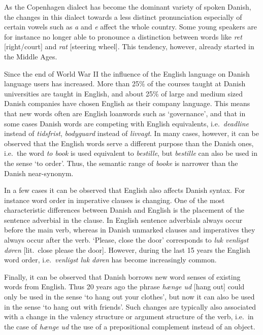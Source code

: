 \documentclass[]{../../metanetpaper}
\begin{document}
\begin{multicols}{2}
As the Copenhagen dialect has become the dominant variety of spoken Danish, the changes in this dialect towards a less distinct pronunciation especially of certain vowels such as {\it a} and {\it e} affect the whole country. Some young speakers are for instance no longer able to pronounce a distinction between words like {\it ret} [right/court]  and {\it rat} [steering wheel]. This tendency, however, already started in the Middle Ages. 

Since the end of World War II the influence of the English language on Danish language users has increased. More than 25\% of the courses taught at Danish universities are taught in English, and about 25\% of large and medium sized Danish companies have chosen English as their company language.   This means that new words often are English loanwords such as `governance', and that in some cases Danish words are competing with English equivalents, i.e.\ {\it deadline} instead of {\it tidsfrist}, {\it bodyguard} instead of {\it livvagt}. In many cases, however, it can be observed that the English words serve a different purpose than the Danish ones, i.e.\ the word {\it to book} is used equivalent to {\it bestille},  but {\it bestille} can also be used in the sense `to order'. Thus, the semantic range of {\it booke} is narrower than the Danish near-synonym. 

In a few cases it can be observed that English also affects Danish syntax. For instance word order in imperative clauses is changing. One of the most characteristic differences between Danish and English is the placement of the sentence adverbial in the clause. In English sentence adverbials always occur before the main verb, whereas in Danish unmarked clauses and imperatives they always occur after the verb. `Please, close the door' corresponds to {\it luk venligst d\o ren} [lit.\ close please the door]. However, during the last 15 years the English word order, i.e.\  {\it venligst luk d\o ren} has become increasingly common. 

Finally, it can be observed that Danish borrows new word senses of existing words from English. Thus 20 years ago the phrase {\it h\ae nge ud} [hang out]  could only be used in the sense `to hang out your clothes', but now it can also be used in the sense `to hang out with friends'. Such changes are typically also associated with a change in the valency structure or argument structure of the verb, i.e.\ in the case of {\it h\ae nge ud} the use of a prepositional complement instead of an object.


\end{multicols}
\end{document}

